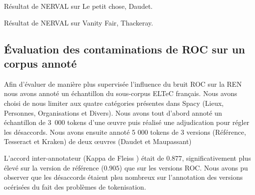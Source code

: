 \begin{table}[h!]
     \centering

     \caption{Résultat de \textsc{NERVAL} sur {\normalfont Le petit chose}, Daudet.}
     \label{tab:NERVAL_DAUDET}
 \end{table}

   \begin{table}[h!]
     \centering

     \caption{Résultat de \textsc{NERVAL} sur {\normalfont Vanity Fair}, Thackeray.}
     \label{tab:NERVAL_THACKERAY}
 \end{table}


\subsection{\'Evaluation des contaminations de ROC sur un corpus annoté}

Afin d'évaluer de manière plus supervisée l'influence du bruit ROC sur la REN nous avons annoté un échantillon du sous-corpus ELTeC français.
 Nous avons choisi de nous limiter aux quatre catégories présentes dans Spacy (Lieux, Personnes, Organisations et Divers).
  Nous avons tout d'abord annoté un échantillon de 3~000 tokens d'une œuvre  puis réalisé une adjudication pour régler les désaccords. 
  Nous avons ensuite annoté 5 000 tokens de 3 versions (Référence, Tesseract et Kraken) de deux œuvres (Daudet et Maupassant)

L'accord inter-annotateur (Kappa de  Fleiss \cite{fleiss2013statistical}) était de $0.877$, significativement plus élevé sur la version de référence ($0.905$) que sur les versions ROC. Nous avons pu observer que les désaccords étaient plsu nombreux sur l'annotation des versions océrisées du fait des problèmes de tokenisation.

